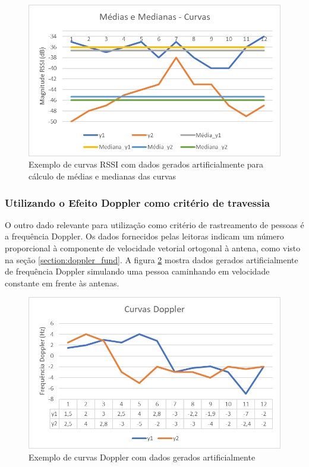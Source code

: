    \begin{figure}[H]
    \centering
    \includegraphics[width=0.8\linewidth]{figs/Metodologia/mediamediana.png}
    \caption{Exemplo de curvas RSSI com dados gerados artificialmente para cálculo de médias e medianas das curvas}
    \label{fig:mediamediana_met}
\end{figure}
 

 \subsubsection{Utilizando o Efeito Doppler como critério de travessia} \label{section:doppler_met}
 
  O outro dado relevante para utilização como critério de rastreamento de pessoas é a frequência Doppler. Os dados fornecidos pelas leitoras indicam um número proporcional à componente de velocidade vetorial ortogonal à antena, como visto na seção \ref{section:doppler_fund}. A figura \ref{fig:doppler_MET} mostra dados gerados artificialmente de frequência Doppler simulando uma pessoa caminhando em velocidade constante em frente às antenas.
 
   \begin{figure}[H]
    \centering
    \includegraphics[width=0.8\linewidth]{figs/Metodologia/image003.png}
    \caption{Exemplo de curvas Doppler com dados gerados artificialmente}
    \label{fig:doppler_MET}
\end{figure}

